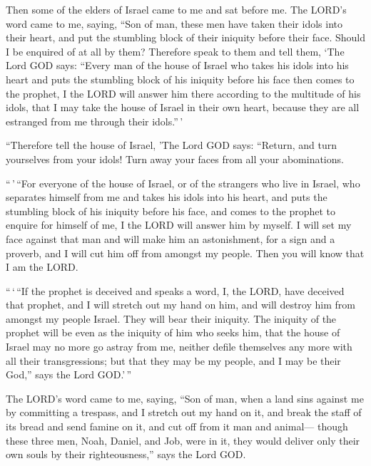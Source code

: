  Then some of the elders of Israel came to me and sat
before me.  The LORD's word came to me, saying,
 ``Son of man, these men have taken their idols into their
heart, and put the stumbling block of their iniquity before their face.
Should I be enquired of at all by them?  Therefore speak
to them and tell them, `The Lord GOD says: ``Every man of the house of
Israel who takes his idols into his heart and puts the stumbling block
of his iniquity before his face then comes to the prophet, I the LORD
will answer him there according to the multitude of his idols,
 that I may take the house of Israel in their own heart,
because they are all estranged from me through their idols.''\,'

 ``Therefore tell the house of Israel, 'The Lord GOD says:
``Return, and turn yourselves from your idols! Turn away your faces from
all your abominations.

 ``\,'\,``For everyone of the house of Israel, or of the
strangers who live in Israel, who separates himself from me and takes
his idols into his heart, and puts the stumbling block of his iniquity
before his face, and comes to the prophet to enquire for himself of me,
I the LORD will answer him by myself.  I will set my face
against that man and will make him an astonishment, for a sign and a
proverb, and I will cut him off from amongst my people. Then you will
know that I am the LORD.

 ``\,`\,``If the prophet is deceived and speaks a word, I,
the LORD, have deceived that prophet, and I will stretch out my hand on
him, and will destroy him from amongst my people Israel. 
They will bear their iniquity. The iniquity of the prophet will be even
as the iniquity of him who seeks him,  that the house of
Israel may no more go astray from me, neither defile themselves any more
with all their transgressions; but that they may be my people, and I may
be their God,'' says the Lord GOD.'\,''

 The LORD's word came to me, saying, 
``Son of man, when a land sins against me by committing a trespass, and
I stretch out my hand on it, and break the staff of its bread and send
famine on it, and cut off from it man and animal--- 
though these three men, Noah, Daniel, and Job, were in it, they would
deliver only their own souls by their righteousness,'' says the Lord
GOD.

